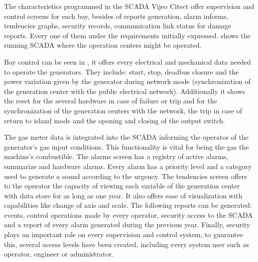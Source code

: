 The characteristics programmed in the SCADA Vijeo Citect offer
supervision and control screens for each bay, besides of reports
generation, alarm informs, tendencies graphs, security records,
communication link status for damage reports. Every one of them
under the requirements initially expressed. 
shows the running SCADA where the operation centers might be operated.

Bay control can be seen in , it offers every electrical
and mechanical data needed to operate the generators. They include:
start, stop, deadbus closure and the power variation given by the
generator during network mode (synchronization of the generation
center with the public electrical network). Additionally it shows the
reset for the several hardware in case of failure or trip and for the
synchronization of the generation centers with the network, the trip
in case of return to island mode and the opening and closing of the
output switch.

The gas meter data is integrated into the SCADA informing the operator
of the generator's gas input conditions. This functionality is vital
for being the gas the machine's combustible. The alarms screen has a
registry of active alarms, summarize and hardware alarms. Every alarm
has a priority level and a category used to generate a sound according
to the urgency. The tendencies screen offers to the operator the
capacity of viewing each variable of the generation center with data
store for as long as one year. It also offers ease of visualization
with capabilities like change of axis and scale. The following reports
can be generated: events, control operations made by every operator,
security access to the SCADA and a report of every alarm generated
during the previous year. Finally, security plays an important role on
every supervision and control system, to guarantee this, several access
levels have been created, including every system user such as operator,
engineer or administrator.
